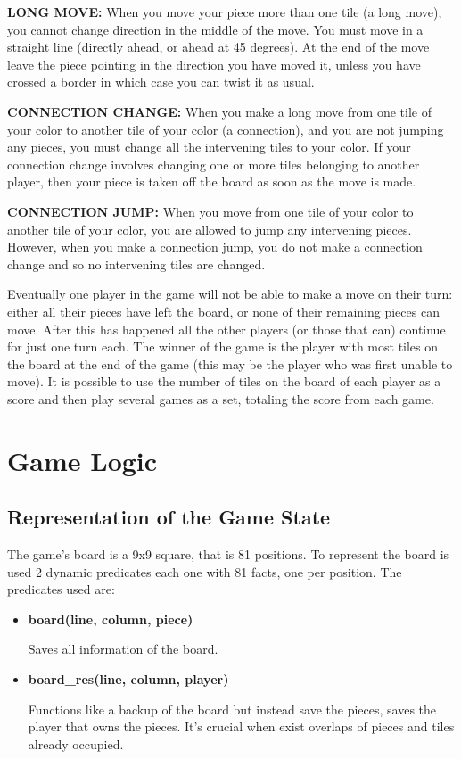 \documentclass[a4paper]{article}
\begin{document}
\textbf{LONG MOVE:} When you move your piece more than one tile (a long move), you cannot change direction in the middle of the move. You must move in a straight line (directly ahead, or ahead at 45 degrees). At the end of the move leave the piece pointing in the direction you have moved it, unless you have crossed a border in which case you can twist it as usual. 
    
\textbf{CONNECTION CHANGE:} When you make a long move from one tile of your color to another tile of your color (a connection), and you are not jumping any pieces, you must change all the intervening tiles to your color. If your connection change involves changing one or more tiles belonging to another player, then your piece is taken off the board as soon as the move is made.
    
\textbf{CONNECTION JUMP:} When you move from one tile of your color to another tile of your color, you are allowed to jump any intervening pieces. However, when you make a connection jump, you do not make a connection change and so no intervening tiles are changed.
   
Eventually one player in the game will not be able to make a move on their turn: either all their pieces have left the board, or none of their remaining pieces can move. After this has happened all the other players (or those that can) continue for just one turn each. The winner of the game is the player with most tiles on the board at the end of the game (this may be the player who was first unable to move). It is possible to use the number of tiles on the board of each player as a score and then play several games as a set, totaling the score from each game. 


\vspace{10mm}
\section{Game Logic}

\subsection{Representation of the Game State}
The game's board is a 9x9 square, that is 81 positions. To represent the board is used 2 dynamic predicates each one with 81 facts, one per position. The predicates used are:
\begin{itemize}
\item \textbf{board(line, column, piece)}

Saves all information of the board.

\item \textbf{board\_res(line, column, player)}

Functions like a backup of the board but instead save the pieces, saves the player that owns the pieces. It's crucial when exist overlaps of pieces and tiles already occupied. 
\end{itemize}
\end{document}
